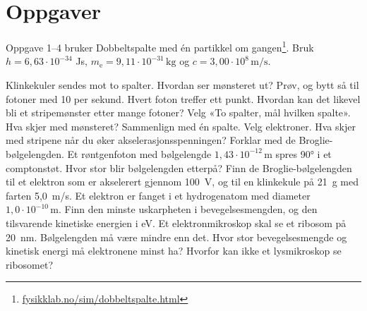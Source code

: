 \documentclass[11pt]{article}
\begin{document}

\section*{Oppgaver}

Oppgave 1–4 bruker Dobbeltspalte med én partikkel om gangen\footnote{\url{fysikklab.no/sim/dobbeltspalte.html}}. Bruk $h = 6{,}63 \cdot 10^{-34}$ Js, $m_{\mathrm{e}} = 9{,}11 \cdot 10^{-31}\,\mathrm{kg}$ og $c = 3{,}00 \cdot 10^{8}\,\mathrm{m/s}$.

\begin{oppgaveliste}
\oppgave {}Klinkekuler sendes mot to spalter. Hvordan ser mønsteret ut? Prøv, og bytt så til fotoner med 10 per sekund.
\svar
\oppgave {}Hvert foton treffer ett punkt. Hvordan kan det likevel bli et stripemønster etter mange fotoner?
\svar
\oppgave {}Velg «To spalter, mål hvilken spalte». Hva skjer med mønsteret? Sammenlign med én spalte.
\svar
\oppgave {}Velg elektroner. Hva skjer med stripene når du øker akselerasjonsspenningen? Forklar med de Broglie-bølgelengden.
\svar
\oppgave {}Et røntgenfoton med bølgelengde $1{,}43 \cdot 10^{-12}\,\mathrm{m}$ spres 90° i et comptonstøt. Hvor stor blir bølgelengden etterpå?
\svar
\oppgave {}Finn de Broglie-bølgelengden til et elektron som er akselerert gjennom 100~V, og til en klinkekule på 21~g med farten 5,0~m/s.
\svar
\oppgave {}Et elektron er fanget i et hydrogenatom med diameter $1{,}0 \cdot 10^{-10}\,\mathrm{m}$. Finn den minste uskarpheten i bevegelsesmengden, og den tilsvarende kinetiske energien i eV.
\svar
\oppgave {}Et elektronmikroskop skal se et ribosom på 20~nm. Bølgelengden må være mindre enn det. Hvor stor bevegelsesmengde og kinetisk energi må elektronene minst ha? Hvorfor kan ikke et lysmikroskop se ribosomet?
\svar
\end{oppgaveliste}
\end{document}
